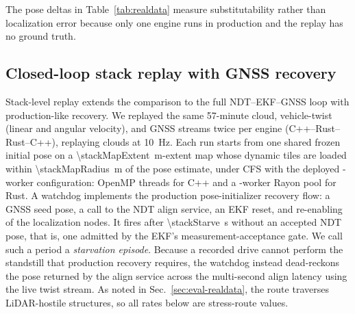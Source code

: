 The pose deltas in Table~\ref{tab:realdata} measure substitutability rather than localization
error because only one engine runs in production and the replay has no ground truth.

\subsection{Closed-loop stack replay with GNSS recovery}
\label{sec:eval-stack}
Stack-level replay extends the comparison to the full NDT--EKF--GNSS loop with
production-like recovery. We replayed the same 57-minute cloud, vehicle-twist (linear and
angular velocity), and GNSS streams twice per engine (C++--Rust--Rust--C++), replaying
\stackInputFrames{} clouds at \SI{10}{Hz}. Each run starts from one shared frozen initial
pose on a \SI{\stackMapExtent}{m}-extent map whose dynamic tiles are loaded within
\SI{\stackMapRadius}{m} of the pose estimate, under CFS with the deployed
\stackWorkers-worker configuration: \stackWorkers{} OpenMP threads for C++ and a
\stackWorkers-worker Rayon pool for Rust. A watchdog implements the production pose-initializer recovery flow: a GNSS
seed pose, a call to the NDT align service, an EKF reset, and re-enabling of the
localization nodes. It fires after \SI{\stackStarve}{s} without an accepted NDT pose, that
is, one admitted by the EKF's measurement-acceptance gate. We call such a period a
\emph{starvation episode}. Because a recorded drive cannot perform the standstill that
production recovery requires, the watchdog instead dead-reckons the pose returned by the
align service across the multi-second align latency using the live twist stream. As noted
in Sec.~\ref{sec:eval-realdata}, the route traverses LiDAR-hostile structures, so
all rates below are stress-route values.

